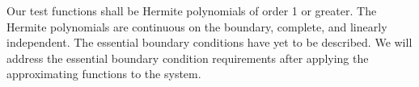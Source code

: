 Our test functions shall be Hermite polynomials of order 1 or greater. The Hermite polynomials are continuous on the boundary, complete, and linearly independent. The essential boundary conditions have yet to be described. We will address the essential boundary condition requirements after applying the approximating functions to the system.



